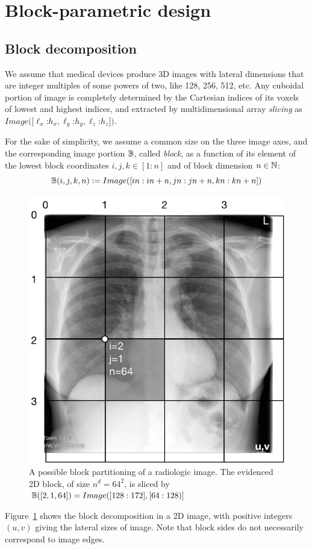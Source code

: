 \documentclass[11pt, oneside]{amsart}   	%
\begin{document}
%

\section{Block-parametric design}\label{sec:filter}

\subsection{Block decomposition}\label{sec:bbbb}

We assume that medical devices produce 3D images with lateral dimensions that are integer multiples of some powers of two, like 128, 256, 512, etc.
Any cuboidal portion of image is completely determined by the Cartesian indices of its voxels of lowest and highest indices, and extracted by multidimensional array \emph{slicing} as $Image([\ell_x$:$h_x, \ell_y$:$h_y, \ell_z$:$h_z])$.

For the sake of simplicity, we assume a common size on the three image axes, and the corresponding image portion $\mathbb{B}$, called \emph{block}, as a function of its element of the  lowest  block  coordinates $i,j,k\in [1:n]$ and of block dimension $n\in\mathbb{N}$:
\[
\mathbb{B}(i,j,k,n) := Image([in:in+n, jn:jn+n, kn:kn+n]) 
\]

\begin{figure}[htbp] %
   \centering
   \includegraphics[width=0.5\linewidth]{figs/blocks} 
   \caption{A possible block partitioning of a radiologic image. The evidenced 2D block, of size $n^d=64^2$, is sliced by $\mathbb{B}([2,1,64]) = Image([128:172],[64:128)]$}
   \label{fig:blocks}
\end{figure}


Figure~\ref{fig:blocks} shows the block decomposition in a 2D image, with positive integers $(u,v)$ giving the lateral sizes of image. Note that block sides do not necessarily correspond to image edges. 
\end{document}
